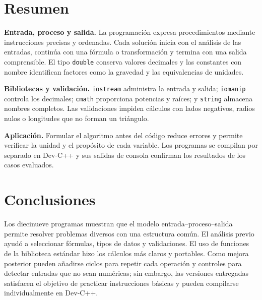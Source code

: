 \documentclass[spanish,letterpaper,oneside]{article}
\begin{document}
\section{Resumen}
\begin{framed}
\textbf{Entrada, proceso y salida.} La programación expresa procedimientos mediante instrucciones precisas y ordenadas. Cada solución inicia con el análisis de las entradas, continúa con una fórmula o transformación y termina con una salida comprensible. El tipo \texttt{double} conserva valores decimales y las constantes con nombre identifican factores como la gravedad y las equivalencias de unidades.

\medskip
\textbf{Bibliotecas y validación.} \texttt{iostream} administra la entrada y salida; \texttt{iomanip} controla los decimales; \texttt{cmath} proporciona potencias y raíces; y \texttt{string} almacena nombres completos. Las validaciones impiden cálculos con lados negativos, radios nulos o longitudes que no forman un triángulo.

\medskip
\textbf{Aplicación.} Formular el algoritmo antes del código reduce errores y permite verificar la unidad y el propósito de cada variable. Los programas se compilan por separado en Dev-C++ y sus salidas de consola confirman los resultados de los casos evaluados.
\end{framed}

\section{Conclusiones}
Los diecinueve programas muestran que el modelo entrada--proceso--salida permite resolver problemas diversos con una estructura común. El análisis previo ayudó a seleccionar fórmulas, tipos de datos y validaciones. El uso de funciones de la biblioteca estándar hizo los cálculos más claros y portables. Como mejora posterior pueden añadirse ciclos para repetir cada operación y controles para detectar entradas que no sean numéricas; sin embargo, las versiones entregadas satisfacen el objetivo de practicar instrucciones básicas y pueden compilarse individualmente en Dev-C++.
\end{document}
